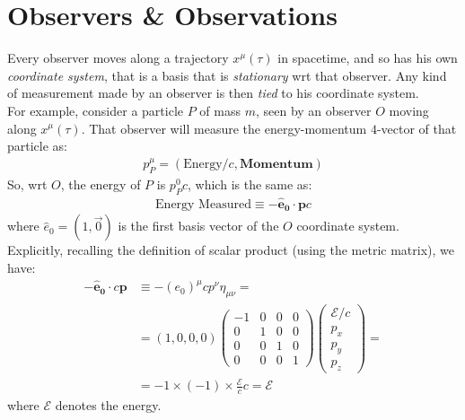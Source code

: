 \documentclass[../template.tex]{subfiles}
\begin{document}
\section{Observers \& Observations}
Every observer moves along a trajectory $x^\mu(\tau)$ in spacetime, and so has his own \textit{coordinate system}, that is a basis that is \textit{stationary} wrt that observer. Any kind of measurement made by an observer is then \textit{tied} to his coordinate system.\\
For example, consider a particle $P$ of mass $m$, seen by an observer $O$  moving along $x^\mu(\tau)$. That observer will measure the energy-momentum $4$-vector of that particle as:
\begin{align*}
    p^\mu_P = \left(\text{Energy}/c, \textbf{Momentum}\right)
\end{align*} 
So, wrt $O$, the energy of $P$ is $p^0_P c$, which is the same as:
\begin{align*}
    \text{Energy Measured} \equiv - \bm{\hat{e}_0} \cdot \bm{p} c
\end{align*} 
where $\hat{e}_0 = (1,\vec{0})$ is the first basis vector of the $O$ coordinate system.\\
Explicitly, recalling the definition of scalar product (using the metric matrix), we have:
\begin{align*}
    -\bm{\hat{e}_0} \cdot c\bm{p} &\equiv -(e_0)^\mu cp^\nu \eta_{\mu \nu} =\\
    &= (1,0,0,0) \left(\begin{array}{cccc}
    -1 & 0 & 0 & 0 \\ 
    0 & 1 & 0 & 0 \\ 
    0 & 0 & 1 & 0 \\ 
    0 & 0 & 0 & 1
    \end{array}\right) \begin{pmatrix}
    \mathcal{E}/c \\ 
    p_x \\ 
    p_y \\ 
    p_z
    \end{pmatrix} = \\
    &= -1 \times (-1) \times \frac{\mathcal{E}}{c}c  = \mathcal{E}
\end{align*}
where $\mathcal{E}$ denotes the energy.\\
\end{document}
